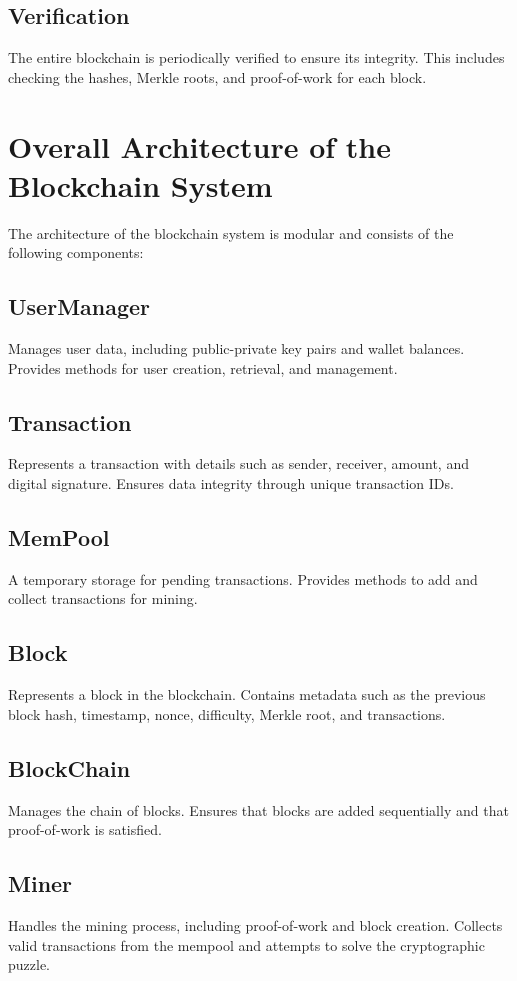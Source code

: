 \documentclass[12pt]{article}
\begin{document}
\subsection{Verification}
The entire blockchain is periodically verified to ensure its integrity. This includes checking the hashes, Merkle roots, and proof-of-work for each block.

\section{Overall Architecture of the Blockchain System}

The architecture of the blockchain system is modular and consists of the following components:

\subsection{UserManager}
Manages user data, including public-private key pairs and wallet balances. Provides methods for user creation, retrieval, and management.

\subsection{Transaction}
Represents a transaction with details such as sender, receiver, amount, and digital signature. Ensures data integrity through unique transaction IDs.

\subsection{MemPool}
A temporary storage for pending transactions. Provides methods to add and collect transactions for mining.

\subsection{Block}
Represents a block in the blockchain. Contains metadata such as the previous block hash, timestamp, nonce, difficulty, Merkle root, and transactions.

\subsection{BlockChain}
Manages the chain of blocks. Ensures that blocks are added sequentially and that proof-of-work is satisfied.

\subsection{Miner}
Handles the mining process, including proof-of-work and block creation. Collects valid transactions from the mempool and attempts to solve the cryptographic puzzle.
\end{document}
